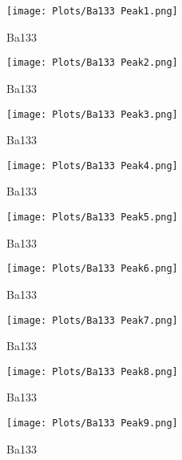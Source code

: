 \documentclass[]{article}
\begin{document}
\begin{figure}
	\centering
	\texttt{[image: Plots/Ba133 Peak1.png]}
	\caption{Ba133}
\end{figure}\begin{figure}
\centering
\texttt{[image: Plots/Ba133 Peak2.png]}
\caption{Ba133}
\end{figure}
\begin{figure}
\centering
\texttt{[image: Plots/Ba133 Peak3.png]}
\caption{Ba133}
\end{figure}
\begin{figure}
	\centering
	\texttt{[image: Plots/Ba133 Peak4.png]}
	\caption{Ba133}
\end{figure}
\begin{figure}
\centering
\texttt{[image: Plots/Ba133 Peak5.png]}
\caption{Ba133}
\end{figure}
\begin{figure}
	\centering
	\texttt{[image: Plots/Ba133 Peak6.png]}
	\caption{Ba133}
\end{figure}
\begin{figure}
	\centering
	\texttt{[image: Plots/Ba133 Peak7.png]}
	\caption{Ba133}
\end{figure}
\begin{figure}
	\centering
	\texttt{[image: Plots/Ba133 Peak8.png]}
	\caption{Ba133}
\end{figure}
\begin{figure}
	\centering
	\texttt{[image: Plots/Ba133 Peak9.png]}
	\caption{Ba133}
\end{figure}
\end{document}
